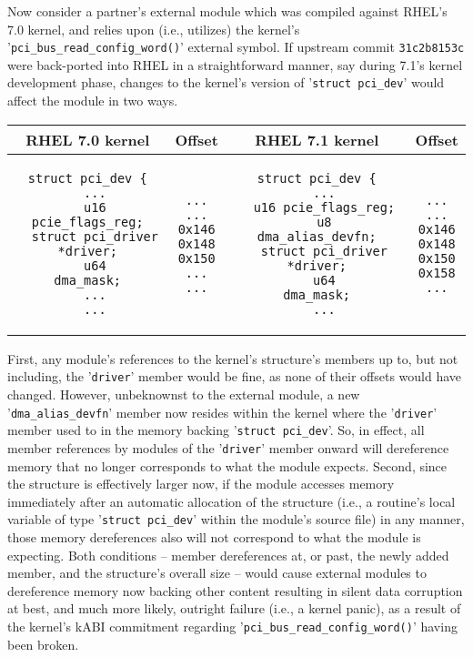 \documentclass[10pt,oneside,english]{book}
\begin{document}
Now consider a partner's external module which was compiled against
RHEL's 7.0 kernel, and relies upon (i.e., utilizes) the kernel's '\texttt{pci\_bus\_read\_config\_word()}'
external symbol. If upstream commit \texttt{31c2b8153c} were back-ported
into RHEL in a straightforward manner, say during 7.1's kernel development
phase, changes to the kernel's version of '\texttt{struct pci\_dev}'
would affect the module in two ways.

\begin{tabular}[t]{|c|c|c|c|}
\hline 
RHEL 7.0 kernel & Offset & RHEL 7.1 kernel & Offset\tabularnewline
\hline 
\hline 
\begin{lstlisting}
struct pci_dev {
  ...
  u16 pcie_flags_reg;
  struct pci_driver *driver;
  u64               dma_mask;
  ...
  ...
\end{lstlisting}
&
\begin{lstlisting}
...
...
0x146
0x148
0x150
...
...
\end{lstlisting}
&
\begin{lstlisting}
struct pci_dev {
  ...
  u16 pcie_flags_reg;
  u8                dma_alias_devfn;
  struct pci_driver *driver;
  u64               dma_mask;
  ...
\end{lstlisting}
&
\begin{lstlisting}
...
...
0x146
0x148
0x150
0x158
...
\end{lstlisting}
\tabularnewline
\hline 
\end{tabular}

First, any module's references to the kernel's structure's members
up to, but not including, the '\texttt{driver}' member would be fine,
as none of their offsets would have changed. However, unbeknownst
to the external module, a new '\texttt{dma\_alias\_devfn}' member
now resides within the kernel where the '\texttt{driver}' member used
to in the memory backing '\texttt{struct pci\_dev}'. So, in effect,
all member references by modules of the '\texttt{driver}' member onward
will dereference memory that no longer corresponds to what the module
expects. Second, since the structure is effectively larger now, if
the module accesses memory immediately after an automatic allocation
of the structure (i.e., a routine's local variable of type '\texttt{struct
pci\_dev}' within the module's source file) in any manner, those memory
dereferences also will not correspond to what the module is expecting.
Both conditions -- member dereferences at, or past, the newly added
member, and the structure's overall size -- would cause external
modules to dereference memory now backing other content resulting
in silent data corruption at best, and much more likely, outright
failure (i.e., a kernel panic), as a result of the kernel's kABI commitment
regarding '\texttt{pci\_bus\_read\_config\_word()}' having been broken.
\end{document}
